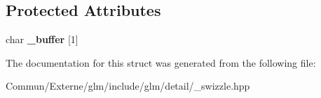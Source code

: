 \subsection*{Protected Attributes}
\begin{DoxyCompactItemize}
\item 
char {\bfseries \+\_\+buffer} \mbox{[}1\mbox{]}\hypertarget{structglm_1_1detail_1_1__swizzle__base0_afd4b7f15c9acff4cdef808f559ffec2d}{}\label{structglm_1_1detail_1_1__swizzle__base0_afd4b7f15c9acff4cdef808f559ffec2d}

\end{DoxyCompactItemize}


The documentation for this struct was generated from the following file\+:\begin{DoxyCompactItemize}
\item 
Commun/\+Externe/glm/include/glm/detail/\+\_\+swizzle.\+hpp\end{DoxyCompactItemize}
